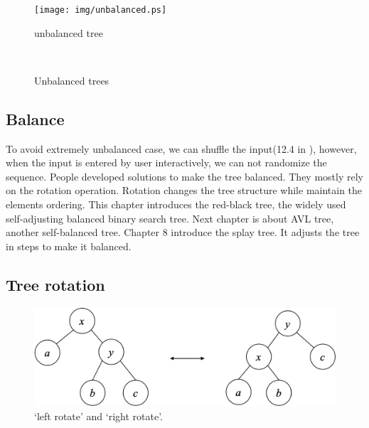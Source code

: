 \documentclass[b5paper]{article}
\begin{document}
\begin{figure}[htbp]
  \centering
  \texttt{[image: img/unbalanced.ps]}
  \caption{unbalanced tree}
  \label{fig:unbalanced-tree}
\end{figure}

\begin{Exercise}
\end{Exercise}

\begin{figure}[htbp]
  \centering
   \\
  \caption{Unbalanced trees}
  \label{fig:unbalanced-trees}
\end{figure}

\subsection{Balance}
To avoid extremely unbalanced case, we can shuffle the input(12.4 in \cite{CLRS}), however, when the input is entered by user interactively, we can not randomize the sequence. People developed solutions to make the tree balanced. They mostly rely on the rotation operation. Rotation changes the tree structure while maintain the elements ordering. This chapter introduces the red-black tree, the widely used self-adjusting balanced binary search tree. Next chapter is about AVL tree, another self-balanced tree. Chapter 8 introduce the splay tree. It adjusts the tree in steps to make it balanced.

\subsection{Tree rotation}

\begin{figure}[htbp]
   \centering
   \includegraphics[scale=0.4]{img/tree-rotation.png}
   \caption{`left rotate' and `right rotate'.}
   \label{fig:tree-rotation}
\end{figure}
\end{document}
